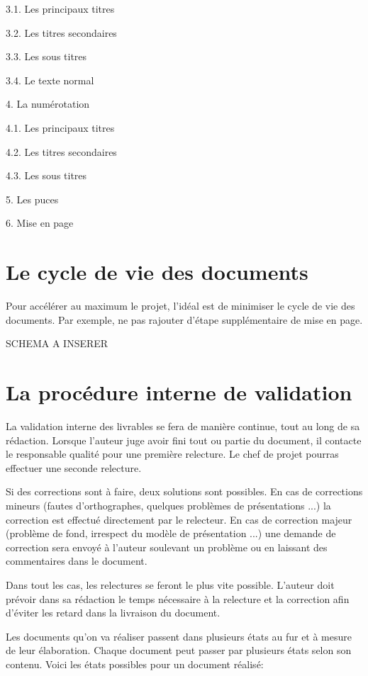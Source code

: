    3.1. Les principaux titres

   3.2. Les titres secondaires

   3.3. Les sous titres

   3.4. Le texte normal

4. La numérotation
   
   4.1. Les principaux titres

   4.2. Les titres secondaires

   4.3. Les sous titres

5. Les puces


6. Mise en page



\section{Le cycle de vie des documents}

Pour accélérer au maximum le projet, l’idéal est de minimiser le cycle de vie des documents.
Par exemple, ne pas rajouter d’étape supplémentaire de mise en page.

SCHEMA A INSERER %


\section{La procédure interne de validation}

La validation interne des livrables se fera de manière continue, tout au long de sa rédaction.
Lorsque l’auteur juge avoir fini tout ou partie du document, il contacte le responsable qualité pour une première relecture. Le chef de projet pourras effectuer une seconde relecture.

Si des corrections sont à faire, deux solutions sont possibles.
En cas de corrections mineurs (fautes d’orthographes, quelques problèmes de présentations ...) la correction est effectué directement par le relecteur.
En cas de correction majeur (problème de fond, irrespect du modèle de présentation ...) une demande de correction sera envoyé à l’auteur soulevant un problème ou en laissant des commentaires dans le document.

Dans tout les cas, les relectures se feront le plus vite possible.
L’auteur doit prévoir dans sa rédaction le temps nécessaire à la relecture et la correction afin d’éviter les retard dans la livraison du document.

Les documents qu'on va réaliser passent dans plusieurs états au fur et à mesure de leur élaboration. Chaque document peut passer par plusieurs états selon son contenu. Voici les états possibles pour un document réalisé:

